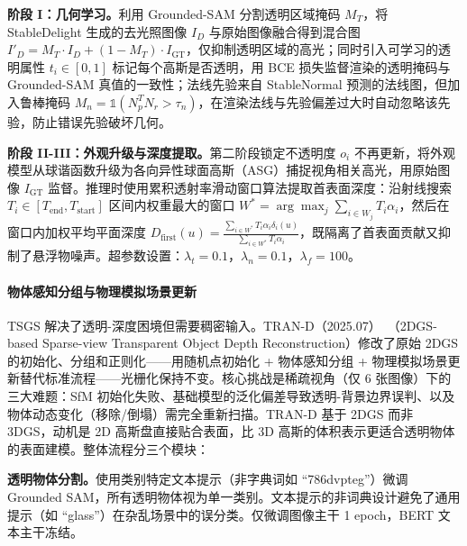 \textbf{阶段 I：几何学习。}利用 Grounded-SAM 分割透明区域掩码 $M_T$，将 StableDelight 生成的去光照图像 $I_D$ 与原始图像融合得到混合图 $I'_D = M_T \cdot I_D + (1 - M_T) \cdot I_{\text{GT}}$，仅抑制透明区域的高光；同时引入可学习的透明属性 $t_i \in [0,1]$ 标记每个高斯是否透明，用 BCE 损失监督渲染的透明掩码与 Grounded-SAM 真值的一致性；法线先验来自 StableNormal 预测的法线图，但加入鲁棒掩码 $M_n = \mathbb{1}(N_p^T N_r > \tau_n)$，在渲染法线与先验偏差过大时自动忽略该先验，防止错误先验破坏几何。

\textbf{阶段 II-III：外观升级与深度提取。}第二阶段锁定不透明度 $o_i$ 不再更新，将外观模型从球谐函数升级为各向异性球面高斯（ASG）捕捉视角相关高光，用原始图像 $I_{\text{GT}}$ 监督。推理时使用累积透射率滑动窗口算法提取首表面深度：沿射线搜索 $T_i \in [T_{\text{end}}, T_{\text{start}}]$ 区间内权重最大的窗口 $W^* = \arg\max_j \sum_{i \in W_j} T_i \alpha_i$，然后在窗口内加权平均平面深度 $D_{\text{first}}(u) = \frac{\sum_{i \in W^*} T_i \alpha_i \delta_i(u)}{\sum_{i \in W^*} T_i \alpha_i}$，既隔离了首表面贡献又抑制了悬浮物噪声。超参数设置：$\lambda_t = 0.1$，$\lambda_n = 0.1$，$\lambda_f = 100$。

\paragraph{物体感知分组与物理模拟场景更新}

TSGS 解决了透明-深度困境但需要稠密输入。TRAN-D（2025.07）~\cite{2507_11069}（2DGS-based Sparse-view Transparent Object Depth Reconstruction）修改了原始 2DGS 的初始化、分组和正则化——用随机点初始化 + 物体感知分组 + 物理模拟场景更新替代标准流程——光栅化保持不变。核心挑战是稀疏视角（仅 6 张图像）下的三大难题：SfM 初始化失败、基础模型的泛化偏差导致透明-背景边界误判、以及物体动态变化（移除/倒塌）需完全重新扫描。TRAN-D 基于 2DGS 而非 3DGS，动机是 2D 高斯盘直接贴合表面，比 3D 高斯的体积表示更适合透明物体的表面建模。整体流程分三个模块：

\textbf{透明物体分割。}使用类别特定文本提示（非字典词如 ``786dvpteg''）微调 Grounded SAM，所有透明物体视为单一类别。文本提示的非词典设计避免了通用提示（如 ``glass''）在杂乱场景中的误分类。仅微调图像主干 1 epoch，BERT 文本主干冻结。

